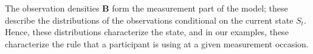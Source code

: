 \documentclass[a4paper,12pt,man]{apa} %
\newcommand{\citep}{\cite}
\newcommand{\citet}{\citeA}
\newcommand{\mat}{\mathbf}
\newcommand{\vc}{\mathbf}
\begin{document}
The observation densities $\mat{B}$ form the measurement part of the
model; these describe the distributions of the observations
conditional on the current state $S_{t}$. Hence, these distributions
characterize the state, and in our examples, these characterize the
rule that a participant is using at a given measurement occasion.

% 
% 
% 
% 
\end{document}
